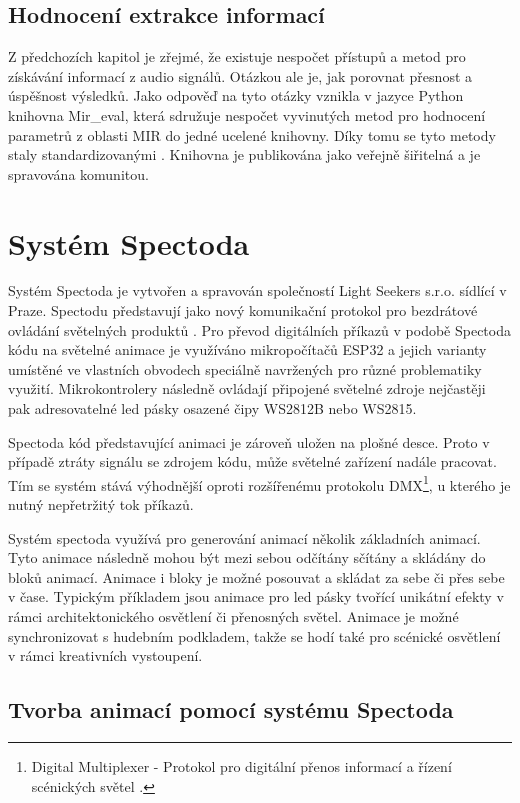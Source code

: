 \subsection{Hodnocení extrakce informací} \label{sec:Mir_eval}
Z předchozích kapitol je zřejmé, že existuje nespočet přístupů a metod pro získávání informací z audio signálů. Otázkou ale je, jak porovnat přesnost a úspěšnost výsledků. Jako odpověď na tyto otázky vznikla v jazyce Python knihovna Mir\_eval, která sdružuje nespočet vyvinutých metod pro hodnocení parametrů z oblasti \acs{MIR} do jedné ucelené knihovny. Díky tomu se tyto metody staly standardizovanými \cite{Mir_eval}. Knihovna je publikována jako veřejně šiřitelná a je spravována komunitou.

\section{Systém Spectoda} \label{sec:Spectoda}
Systém Spectoda je vytvořen a spravován společností Light Seekers s.r.o. sídlící v Praze. Spectodu představují jako nový komunikační protokol pro bezdrátové ovládání světelných produktů \cite{Spectoda}. Pro převod digitálních příkazů v podobě Spectoda kódu na světelné animace je využíváno mikropočítačů ESP32 a jejich varianty umístěné ve vlastních obvodech speciálně navržených pro různé problematiky využití. Mikrokontrolery následně ovládají připojené světelné zdroje nejčastěji pak adresovatelné led pásky osazené čipy WS2812B nebo WS2815.

Spectoda kód představující animaci je zároveň uložen na plošné desce. Proto v případě ztráty signálu se zdrojem kódu, může světelné zařízení nadále pracovat. Tím se systém stává výhodnější oproti rozšířenému protokolu \acs{DMX}\footnote{Digital Multiplexer - Protokol pro digitální přenos informací a řízení scénických světel \cite{DMX}.}, u kterého je nutný nepřetržitý tok příkazů. 

Systém spectoda využívá pro generování animací několik základních animací. Tyto animace následně mohou být mezi sebou odčítány sčítány a skládány do bloků animací. Animace i bloky je možné posouvat a skládat za sebe či přes sebe v čase. Typickým příkladem jsou animace pro led pásky tvořící unikátní efekty v rámci architektonického osvětlení či přenosných světel. Animace je možné synchronizovat s hudebním podkladem, takže se hodí také pro scénické osvětlení v rámci kreativních vystoupení. 

\subsection{Tvorba animací pomocí systému Spectoda}

